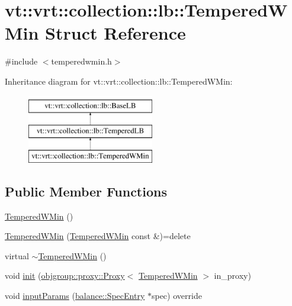 \hypertarget{structvt_1_1vrt_1_1collection_1_1lb_1_1_tempered_w_min}{}\section{vt\+:\+:vrt\+:\+:collection\+:\+:lb\+:\+:Tempered\+W\+Min Struct Reference}
\label{structvt_1_1vrt_1_1collection_1_1lb_1_1_tempered_w_min}


{\ttfamily \#include $<$temperedwmin.\+h$>$}

Inheritance diagram for vt\+:\+:vrt\+:\+:collection\+:\+:lb\+:\+:Tempered\+W\+Min\+:\begin{figure}[H]
\begin{center}
\leavevmode
\includegraphics[height=3.000000cm]{structvt_1_1vrt_1_1collection_1_1lb_1_1_tempered_w_min}
\end{center}
\end{figure}
\subsection*{Public Member Functions}
\begin{DoxyCompactItemize}
\item 
\hyperlink{structvt_1_1vrt_1_1collection_1_1lb_1_1_tempered_w_min_a0651609fa1544383a93ef8c178be4780}{Tempered\+W\+Min} ()
\item 
\hyperlink{structvt_1_1vrt_1_1collection_1_1lb_1_1_tempered_w_min_a757b4b20c43d657d4ceba856c3da13ee}{Tempered\+W\+Min} (\hyperlink{structvt_1_1vrt_1_1collection_1_1lb_1_1_tempered_w_min}{Tempered\+W\+Min} const \&)=delete
\item 
virtual \hyperlink{structvt_1_1vrt_1_1collection_1_1lb_1_1_tempered_w_min_a7225191709849520f021c6a5df9f26ba}{$\sim$\+Tempered\+W\+Min} ()
\item 
void \hyperlink{structvt_1_1vrt_1_1collection_1_1lb_1_1_tempered_w_min_a4568be2f1baa683968308e48a0743dea}{init} (\hyperlink{structvt_1_1objgroup_1_1proxy_1_1_proxy}{objgroup\+::proxy\+::\+Proxy}$<$ \hyperlink{structvt_1_1vrt_1_1collection_1_1lb_1_1_tempered_w_min}{Tempered\+W\+Min} $>$ in\+\_\+proxy)
\item 
void \hyperlink{structvt_1_1vrt_1_1collection_1_1lb_1_1_tempered_w_min_acac5be655a5286211177c83e5379efae}{input\+Params} (\hyperlink{structvt_1_1vrt_1_1collection_1_1balance_1_1_spec_entry}{balance\+::\+Spec\+Entry} $\ast$spec) override
\end{DoxyCompactItemize}
